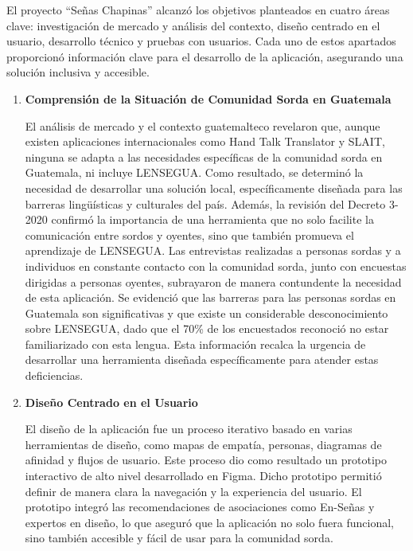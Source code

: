 El proyecto ``Señas Chapinas'' alcanzó los objetivos planteados en cuatro áreas clave: investigación de mercado y análisis del contexto, diseño centrado en el usuario, desarrollo técnico y pruebas con usuarios. Cada uno de estos apartados proporcionó información clave para el desarrollo de la aplicación, asegurando una solución inclusiva y accesible.

\begin{enumerate}
    \item \textbf{Comprensión de la Situación de Comunidad Sorda en Guatemala}
    
    El análisis de mercado y el contexto guatemalteco revelaron que, aunque existen aplicaciones internacionales como Hand Talk Translator y SLAIT, ninguna se adapta a las necesidades específicas de la comunidad sorda en Guatemala, ni incluye LENSEGUA. Como resultado, se determinó la necesidad de desarrollar una solución local, específicamente diseñada para las barreras lingüísticas y culturales del país. Además, la revisión del Decreto 3-2020 confirmó la importancia de una herramienta que no solo facilite la comunicación entre sordos y oyentes, sino que también promueva el aprendizaje de LENSEGUA. Las entrevistas realizadas a personas sordas y a individuos en constante contacto con la comunidad sorda, junto con encuestas dirigidas a personas oyentes, subrayaron de manera contundente la necesidad de esta aplicación. Se evidenció que las barreras para las personas sordas en Guatemala son significativas y que existe un considerable desconocimiento sobre LENSEGUA, dado que el 70\% de los encuestados reconoció no estar familiarizado con esta lengua. Esta información recalca la urgencia de desarrollar una herramienta diseñada específicamente para atender estas deficiencias.
    
    \item \textbf{Diseño Centrado en el Usuario}
    
    El diseño de la aplicación fue un proceso iterativo basado en varias herramientas de diseño, como mapas de empatía, personas, diagramas de afinidad y flujos de usuario. Este proceso dio como resultado un prototipo interactivo de alto nivel desarrollado en Figma. Dicho prototipo permitió definir de manera clara la navegación y la experiencia del usuario. El prototipo integró las recomendaciones de asociaciones como En-Señas y expertos en diseño, lo que aseguró que la aplicación no solo fuera funcional, sino también accesible y fácil de usar para la comunidad sorda. 


\end{enumerate}

